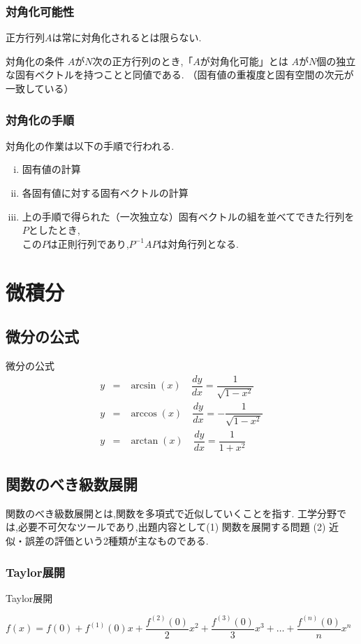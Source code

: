 \documentclass[a4paper]{jsarticle}
\begin{document}
\subsubsection{対角化可能性}
正方行列$A$は常に対角化されるとは限らない.
\begin{itembox}[l]{対角化の条件}
    $A$が$N$次の正方行列のとき,「$A$が対角化可能」とは
    $A$が$N$個の独立な固有ベクトルを持つことと同値である.
    （固有値の重複度と固有空間の次元が一致している）
\end{itembox}
\subsubsection{対角化の手順}
対角化の作業は以下の手順で行われる.
\begin{enumerate}[(i)]
    \item 固有値の計算
    \item 各固有値に対する固有ベクトルの計算
    \item 上の手順で得られた（一次独立な）固有ベクトルの組を並べてできた行列を$P$としたとき,\\
          この$P$は正則行列であり,$P^{-1}AP$は対角行列となる.
\end{enumerate}
\newpage
\section{微積分}
\subsection{微分の公式}
\begin{itembox}[l]{微分の公式}
    \begin{eqnarray*}
        y&=&\arcsin\left(x\right)\quad\dfrac{dy}{dx}=\dfrac{1}{\sqrt{1-x^2}}\\
        y&=&\arccos\left(x\right)\quad\dfrac{dy}{dx}=-\dfrac{1}{\sqrt{1-x^2}}\\
        y&=&\arctan\left(x\right)\quad\dfrac{dy}{dx}=\dfrac{1}{1+x^2}
    \end{eqnarray*}
\end{itembox}
\subsection{関数のべき級数展開}
関数のべき級数展開とは,関数を多項式で近似していくことを指す.
工学分野では,必要不可欠なツールであり,出題内容として(1) 関数を展開する問題
(2) 近似・誤差の評価という2種類が主なものである.
\subsubsection{Taylor展開}
\begin{itembox}[l]{Taylor展開}
    \begin{center}
        $f\left(x\right)=f\left(0\right)+f^{\left(1\right)}\left(0\right)x
            +\dfrac{f^{\left(2\right)}\left(0\right)}{2}x^2
            +\dfrac{f^{\left(3\right)}\left(0\right)}{3}x^3
            +\dots
            +\dfrac{f^{\left(n\right)}\left(0\right)}{n}x^n$
    \end{center}
\end{itembox}
\end{document}
